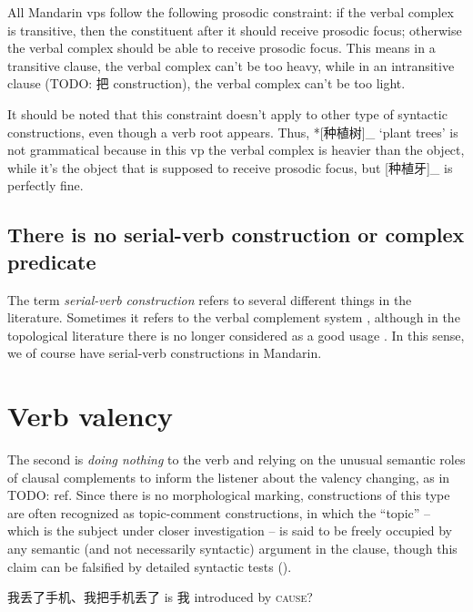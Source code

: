 \documentclass[UTF8, a4paper, oneside, scheme=plain, 12pt]{ctexrep}
\newcommand*{\citesec}[1]{\S~{#1}}
\newcommand*{\term}[1]{\emph{#1}}
\newcommand{\translate}[1]{`#1'}
\newcommand*{\category}[1]{\textsc{#1}}
\begin{document}
All Mandarin \acs{vp}s follow the following prosodic constraint:
if the verbal complex is transitive,
then the constituent after it should receive prosodic focus; 
otherwise the verbal complex should be able to receive prosodic focus. 
This means in a transitive clause, 
the verbal complex can't be too heavy, 
while in an intransitive clause (TODO: 把 construction), 
the verbal complex can't be too light. 

It should be noted that this constraint doesn't apply 
to other type of syntactic constructions, 
even though a verb root appears. 
Thus, *[种植树]_{} \translate{plant trees} 
is not grammatical
because in this \acs{vp} the verbal complex is heavier than the object, 
while it's the object that is supposed to receive prosodic focus, 
but [种植牙]_{} is perfectly fine. 


\section{There is no serial-verb construction or complex predicate}\label{sec:no-serial-verb}

The term \term{serial-verb construction} refers to several different things in the literature.
Sometimes it refers to the verbal complement system
\citep{chen2016mandarin}, 
although in the topological literature 
there is no longer considered as a good usage 
\citep[\citesec{10.1}; note that %
the V2s in Yakkha complex predication highly resembles Mandarin directional verbal complements 
in their formal aspects]{schackow2015grammar}. 
In this sense, we of course have serial-verb constructions in Mandarin.

\chapter{Verb valency}


The second is \emph{doing nothing} to the verb 
and relying on the unusual semantic roles of clausal complements 
to inform the listener about the valency changing,
as in TODO: ref.
Since there is no morphological marking,
constructions of this type are often recognized as topic-comment constructions,
in which the ``topic'' -- which is the subject under closer investigation -- 
is said to be freely occupied by any semantic (and not necessarily syntactic) argument in the clause,
though this claim can be falsified by detailed syntactic tests ().


我丢了手机、我把手机丢了 is 我 introduced by \category{cause}?
\end{document}
